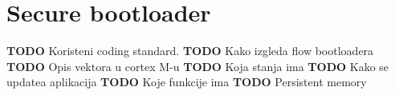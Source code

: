 \chapter{Secure bootloader}
\label{custom_bootloader}
\textbf{TODO} Koristeni coding standard.
\textbf{TODO} Kako izgleda flow bootloadera
\textbf{TODO} Opis vektora u cortex M-u
\textbf{TODO} Koja stanja ima
\textbf{TODO} Kako se updatea aplikacija
\textbf{TODO} Koje funkcije ima
\textbf{TODO} Persistent memory